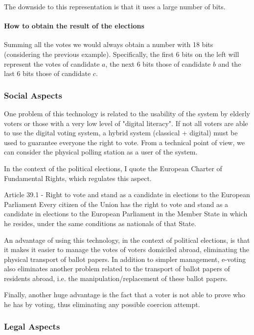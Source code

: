 \documentclass[12pt]{article}
\begin{document}
\noindent The downside to this representation is that it uses a large number of bits.

\paragraph{How to obtain the result of the elections}Summing all the votes we would always obtain a number with 18 bits (considering the previous example). Specifically, the first 6 bits on the left will represent the votes of candidate $a$, the next 6 bits those of candidate $b$ and the last 6 bits those of candidate $c$.

\subsubsection{Social Aspects}\label{soc}

One problem of this technology is related to the usability of the system by elderly voters or those with a very low level of "digital literacy". If not all voters are able to use the digital voting system, a hybrid system (classical + digital) must be used to guarantee everyone the right to vote. From a technical point of view, we can consider the physical polling station as a user of the system.

In the context of the political elections, I quote the European Charter of Fundamental Rights, which regulates this aspect.
\begin{commentbox}{Article 39.1 - Right to vote and stand as a candidate in elections to the European Parliament}
Every citizen of the Union has the right to vote and stand as a candidate in elections to the European Parliament in the Member State in which he resides, under the same conditions as nationals of that State.
\end{commentbox}

An advantage of using this technology, in the context of political elections, is that it makes it easier to manage the votes of voters domiciled abroad, eliminating the physical transport of ballot papers. In addition to simpler management, e-voting also eliminates another problem related to the transport of ballot papers of residents abroad, i.e. the manipulation/replacement of these ballot papers.

Finally, another huge advantage is the fact that a voter is not able to prove who he has by voting, thus eliminating any possible coercion attempt.

\subsubsection{Legal Aspects}\label{leg}
\end{document}
